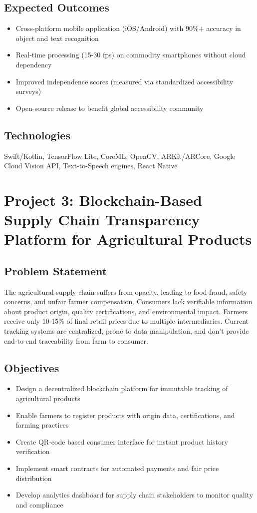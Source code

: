 \documentclass[12pt,a4paper]{article}
\begin{document}
\subsection{Expected Outcomes}
\begin{itemize}[leftmargin=*]
    \item Cross-platform mobile application (iOS/Android) with 90\%+ accuracy in object and text recognition
    \item Real-time processing (15-30 fps) on commodity smartphones without cloud dependency
    \item Improved independence scores (measured via standardized accessibility surveys)
    \item Open-source release to benefit global accessibility community
\end{itemize}

\subsection{Technologies}
Swift/Kotlin, TensorFlow Lite, CoreML, OpenCV, ARKit/ARCore, Google Cloud Vision API, Text-to-Speech engines, React Native

\newpage

\section{Project 3: Blockchain-Based Supply Chain Transparency Platform for Agricultural Products}

\subsection{Problem Statement}
The agricultural supply chain suffers from opacity, leading to food fraud, safety concerns, and unfair farmer compensation. Consumers lack verifiable information about product origin, quality certifications, and environmental impact. Farmers receive only 10-15\% of final retail prices due to multiple intermediaries. Current tracking systems are centralized, prone to data manipulation, and don't provide end-to-end traceability from farm to consumer.

\subsection{Objectives}
\begin{itemize}[leftmargin=*]
    \item Design a decentralized blockchain platform for immutable tracking of agricultural products
    \item Enable farmers to register products with origin data, certifications, and farming practices
    \item Create QR-code based consumer interface for instant product history verification
    \item Implement smart contracts for automated payments and fair price distribution
    \item Develop analytics dashboard for supply chain stakeholders to monitor quality and compliance
\end{itemize}
\end{document}
